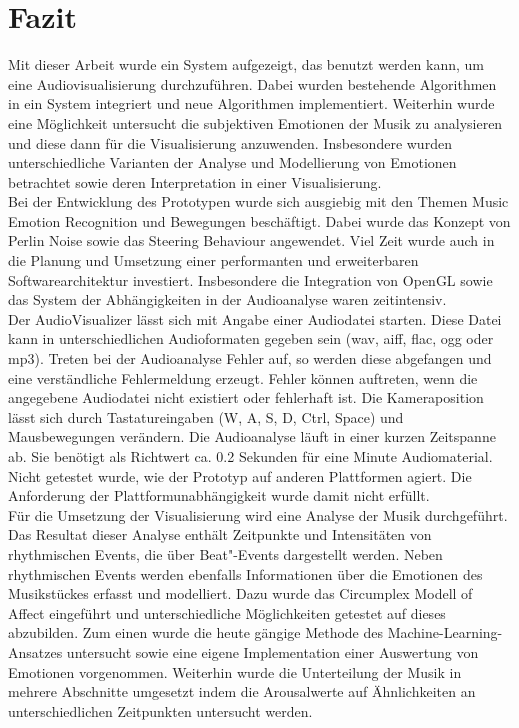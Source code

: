 \documentclass[11pt,a4paper]{article}
\begin{document}

\newpage
\section{Fazit}
Mit dieser Arbeit wurde ein System aufgezeigt, das benutzt werden kann, um eine Audiovisualisierung durchzuführen. Dabei wurden bestehende Algorithmen in ein System integriert und neue Algorithmen implementiert. Weiterhin wurde eine Möglichkeit untersucht die subjektiven Emotionen der Musik zu analysieren und diese dann für die Visualisierung anzuwenden. Insbesondere wurden unterschiedliche Varianten der Analyse und Modellierung von Emotionen betrachtet sowie deren Interpretation in einer Visualisierung.\\
Bei der Entwicklung des Prototypen wurde sich ausgiebig mit den Themen Music Emotion Recognition und Bewegungen beschäftigt. Dabei wurde das Konzept von Perlin Noise sowie das Steering Behaviour angewendet. Viel Zeit wurde auch in die Planung und Umsetzung einer performanten und erweiterbaren Softwarearchitektur investiert. Insbesondere die Integration von OpenGL sowie das System der Abhängigkeiten in der Audioanalyse waren zeitintensiv.\\
Der AudioVisualizer lässt sich mit Angabe einer Audiodatei starten. Diese Datei kann in unterschiedlichen Audioformaten gegeben sein (wav, aiff, flac, ogg oder mp3). Treten bei der Audioanalyse Fehler auf, so werden diese abgefangen und eine verständliche Fehlermeldung erzeugt. Fehler können auftreten, wenn die angegebene Audiodatei nicht existiert oder fehlerhaft ist. Die Kameraposition lässt sich durch Tastatureingaben (W, A, S, D, Ctrl, Space) und Mausbewegungen verändern. Die Audioanalyse läuft in einer kurzen Zeitspanne ab. Sie benötigt als Richtwert ca. 0.2 Sekunden für eine Minute Audiomaterial. Nicht getestet wurde, wie der Prototyp auf anderen Plattformen agiert. Die Anforderung der Plattformunabhängigkeit wurde damit nicht erfüllt.\\
Für die Umsetzung der Visualisierung wird eine Analyse der Musik durchgeführt. Das Resultat dieser Analyse enthält Zeitpunkte und Intensitäten von rhythmischen Events, die über Beat"-Events dargestellt werden. Neben rhythmischen Events werden ebenfalls Informationen über die Emotionen des Musikstückes erfasst und modelliert. Dazu wurde das Circumplex Modell of Affect eingeführt und unterschiedliche Möglichkeiten getestet auf dieses abzubilden. Zum einen wurde die heute gängige Methode des Machine-Learning-Ansatzes untersucht sowie eine eigene Implementation einer Auswertung von Emotionen vorgenommen. Weiterhin wurde die Unterteilung der Musik in mehrere Abschnitte umgesetzt indem die Arousalwerte auf Ähnlichkeiten an unterschiedlichen Zeitpunkten untersucht werden.\\
\end{document}
